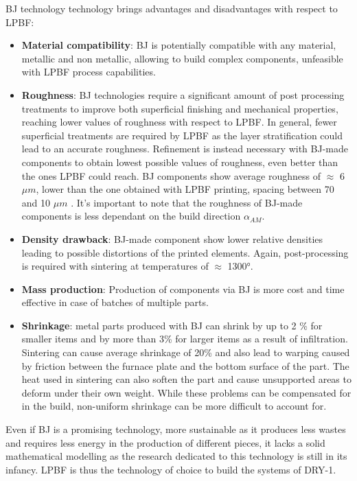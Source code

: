 BJ technology technology brings advantages and disadvantages with respect to LPBF:
\begin{itemize}
  \item \textbf{Material compatibility}: BJ is potentially compatible with any material, metallic and non metallic, allowing to build complex components, unfeasible with LPBF process capabilities.
  \item \textbf{Roughness}: BJ technologies require a significant amount of post processing treatments to improve both superficial finishing and mechanical properties, reaching lower values of roughness with respect to LPBF. In general, fewer superficial treatments are required by LPBF as the layer stratification could lead to an accurate roughness. Refinement is instead necessary with BJ-made components to obtain lowest possible values of roughness, even better than the ones LPBF could reach. BJ components show average roughness of $\approx$ 6 $\mu m$, lower than the one obtained with LPBF printing, spacing between 70 and 10 $\mu m$ \cite{tesi_dottorato}.
  It's important to note that the roughness of BJ-made components is less dependant on the build direction $\alpha_{AM}$.
  \item  \textbf{Density drawback}: BJ-made component show lower relative densities leading to possible distortions of the printed elements. Again, post-processing is required with sintering at temperatures of $\approx$ 1300°. 
  \item \textbf{Mass production}: Production of components via BJ is more cost and time effective in case of batches of multiple parts. 
  \item \textbf{Shrinkage}: metal parts produced with BJ can shrink by up to 2 \% for smaller items and by more than 3\% for larger items as a result of infiltration. Sintering can cause average shrinkage of 20\% and also lead to warping caused by friction between the furnace plate and the bottom surface of the part. The heat used in sintering can also soften the part and cause unsupported areas to deform under their own weight. While these problems can be compensated for in the build, non-uniform shrinkage can be more difficult to account for\cite{bj_camb}.
\end{itemize}

Even if BJ is a promising technology, more sustainable as it produces less wastes and requires less energy in the production of different pieces, it lacks a solid mathematical modelling\cite{bj_inconel} as the research dedicated to this technology is still in its infancy. LPBF is thus the technology of choice to build the systems of DRY-1.

